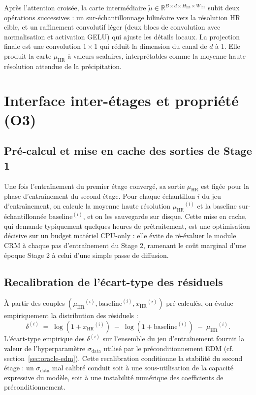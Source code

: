 \documentclass[14pt,a4paper,openany]{extreport}
\theoremstyle{definition}
\newcommand{\HR}{\ensuremath{\text{HR}}}
\newcommand{\xHR}{\ensuremath{x_{\HR}}}
\newcommand{\muHR}{\ensuremath{\mu_{\HR}}}
\begin{document}
Après l'attention croisée, la carte intermédiaire $\tilde{\mu} \in \mathbb{R}^{B \times d \times H_{\mathrm{int}} \times W_{\mathrm{int}}}$ subit deux opérations successives : un sur-échantillonnage bilinéaire vers la résolution HR cible, et un raffinement convolutif léger (deux blocs de convolution avec normalisation et activation GELU) qui ajuste les détails locaux. La projection finale est une convolution $1 \times 1$ qui réduit la dimension du canal de $d$ à $1$. Elle produit la carte $\muHR$ à valeurs scalaires, interprétables comme la moyenne haute résolution attendue de la précipitation.

\section{Interface inter-étages et propriété (O3)}
\label{sec:oracle-o3}

\subsection{Pré-calcul et mise en cache des sorties de Stage 1}
\label{ssec:oracle-cache}

Une fois l'entraînement du premier étage convergé, sa sortie $\muHR$ est figée pour la phase d'entraînement du second étage. Pour chaque échantillon $i$ du jeu d'entraînement, on calcule la moyenne haute résolution $\muHR^{(i)}$ et la baseline sur-échantillonnée $\mathrm{baseline}^{(i)}$, et on les sauvegarde sur disque. Cette mise en cache, qui demande typiquement quelques heures de prétraitement, est une optimisation décisive sur un budget matériel CPU-only : elle évite de ré-évaluer le module CRM à chaque pas d'entraînement du Stage 2, ramenant le coût marginal d'une époque Stage 2 à celui d'une simple passe de diffusion.

\subsection{Recalibration de l'écart-type des résiduels}
\label{ssec:oracle-recalib}

À partir des couples $(\muHR^{(i)}, \mathrm{baseline}^{(i)}, \xHR^{(i)})$ pré-calculés, on évalue empiriquement la distribution des résiduels :
\begin{equation}
  \delta^{(i)} \;=\; \log(1 + \xHR^{(i)}) \;-\; \log(1 + \mathrm{baseline}^{(i)}) \;-\; \muHR^{(i)}.
  \label{eq:residu}
\end{equation}
L'écart-type empirique des $\delta^{(i)}$ sur l'ensemble du jeu d'entraînement fournit la valeur de l'hyperparamètre $\sigma_{\mathrm{data}}$ utilisé par le préconditionnement EDM (cf. section~\ref{sec:oracle-edm}). Cette recalibration conditionne la stabilité du second étage : un $\sigma_{\mathrm{data}}$ mal calibré conduit soit à une sous-utilisation de la capacité expressive du modèle, soit à une instabilité numérique des coefficients de préconditionnement.
\end{document}
